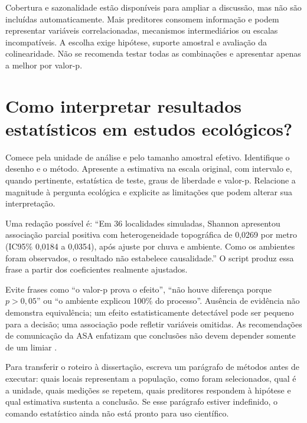 Cobertura e sazonalidade estão disponíveis para ampliar a discussão, mas não são incluídas automaticamente. Mais preditores consomem informação e podem representar variáveis correlacionadas, mecanismos intermediários ou escalas incompatíveis. A escolha exige hipótese, suporte amostral e avaliação da colinearidade. Não se recomenda testar todas as combinações e apresentar apenas a melhor por valor-p.

\section{Como interpretar resultados estatísticos em estudos ecológicos?}
Comece pela unidade de análise e pelo tamanho amostral efetivo. Identifique o desenho e o método. Apresente a estimativa na escala original, com intervalo e, quando pertinente, estatística de teste, graus de liberdade e valor-p. Relacione a magnitude à pergunta ecológica e explicite as limitações que podem alterar sua interpretação.

Uma redação possível é: ``Em 36 localidades simuladas, Shannon apresentou associação parcial positiva com heterogeneidade topográfica de 0,0269 por metro (IC95\% 0,0184 a 0,0354), após ajuste por chuva e ambiente. Como os ambientes foram observados, o resultado não estabelece causalidade.'' O script produz essa frase a partir dos coeficientes realmente ajustados.

Evite frases como ``o valor-p prova o efeito'', ``não houve diferença porque $p>0{,}05$'' ou ``o ambiente explicou 100\% do processo''. Ausência de evidência não demonstra equivalência; um efeito estatisticamente detectável pode ser pequeno para a decisão; uma associação pode refletir variáveis omitidas. As recomendações de comunicação da ASA enfatizam que conclusões não devem depender somente de um limiar \parencite{wasserstein2016}.

\begin{dica}
Para transferir o roteiro à dissertação, escreva um parágrafo de métodos antes de executar: quais locais representam a população, como foram selecionados, qual é a unidade, quais medições se repetem, quais preditores respondem à hipótese e qual estimativa sustenta a conclusão. Se esse parágrafo estiver indefinido, o comando estatístico ainda não está pronto para uso científico.
\end{dica}

